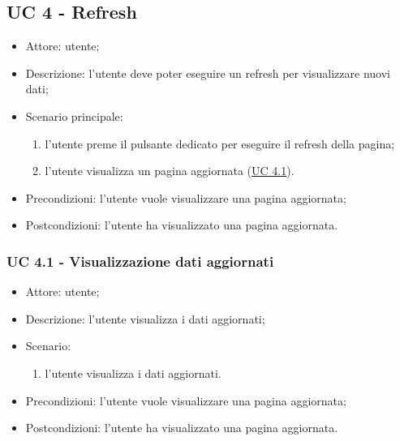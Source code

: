     \subsection{UC 4 - Refresh} \label{sec: UC 4}
    \begin{itemize}
        \item Attore: utente;
        \item Descrizione: l'utente deve poter eseguire un refresh per visualizzare nuovi dati;
        \item Scenario principale:
            \begin{enumerate}
            \item l'utente preme il pulsante dedicato per eseguire il refresh della pagina;
            \item l'utente visualizza un pagina aggiornata (\hyperref[sec: UC 4.1]{UC 4.1}).
            \end{enumerate}
        \item Precondizioni: l'utente vuole visualizzare una pagina aggiornata;
        \item Postcondizioni: l'utente ha visualizzato una pagina aggiornata.
    \end{itemize}

    \subsubsection{UC 4.1 - Visualizzazione dati aggiornati} \label{sec: UC 4.1}
    \begin{itemize}
        \item Attore: utente;
        \item Descrizione: l'utente visualizza i dati aggiornati;
        \item Scenario:
        \begin{enumerate}
        \item l'utente visualizza i dati aggiornati.
        \end{enumerate}
        \item Precondizioni: l'utente vuole visualizzare una pagina aggiornata;
        \item Postcondizioni: l'utente ha visualizzato una pagina aggiornata.
    \end{itemize}


